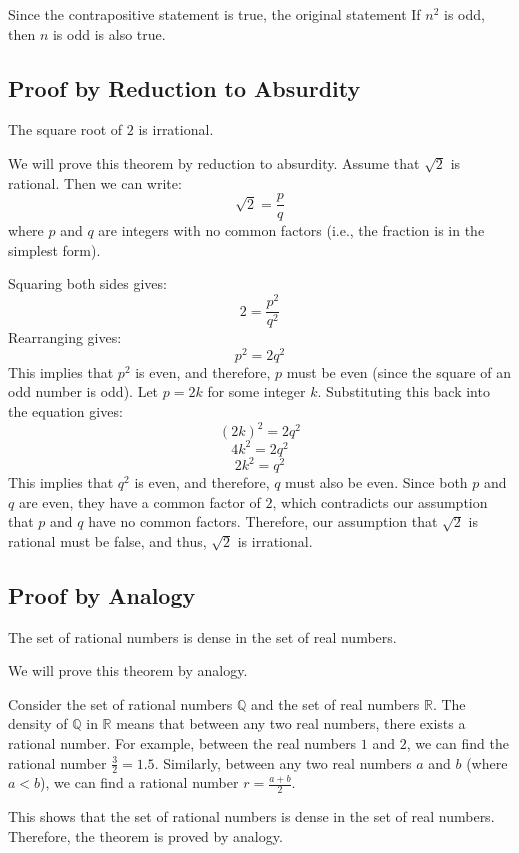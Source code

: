 	Since the contrapositive statement is true, the original statement If \( n^2 \) is odd, then \( n \) is odd is also true.
\QED

\subsection{Proof by Reduction to Absurdity}

The square root of \( 2 \) is irrational.
\vspace{\baselineskip}

	We will prove this theorem by reduction to absurdity. Assume that \( \sqrt{2} \) is rational. Then we can write:
	\[
		\sqrt{2} = \frac{p}{q}
	\]
	where \( p \) and \( q \) are integers with no common factors (i.e., the fraction is in the simplest form).
\vspace{\baselineskip}

	Squaring both sides gives:
	\[
		2 = \frac{p^2}{q^2}
	\]
	Rearranging gives:
	\[
		p^2 = 2q^2
	\]
	This implies that \( p^2 \) is even, and therefore, \( p \) must be even (since the square of an odd number is odd).
	Let \( p = 2k \) for some integer \( k \). Substituting this back into the equation gives:
	\[
		{(2k)}^2 = 2q^2
	\]
	\[
		4k^2 = 2q^2
	\]
	\[
		2k^2 = q^2
	\]
	This implies that \( q^2 \) is even, and therefore, \( q \) must also be even.
	Since both \( p \) and \( q \) are even, they have a common factor of \( 2 \), which contradicts our assumption that \( p \) and \( q \) have no common factors.
	Therefore, our assumption that \( \sqrt{2} \) is rational must be false, and thus, \( \sqrt{2} \) is irrational.

\QED

\subsection{Proof by Analogy}

The set of rational numbers is dense in the set of real numbers.

We will prove this theorem by analogy.
\vspace{\baselineskip}
	
Consider the set of rational numbers \( \mathbb{Q} \) and the set of real numbers \( \mathbb{R} \). The density of \( \mathbb{Q} \) in \( \mathbb{R} \) means that between any two real numbers, there exists a rational number.
For example, between the real numbers \( 1 \) and \( 2 \), we can find the rational number \( \frac{3}{2} = 1.5 \). Similarly, between any two real numbers \( a \) and \( b \) (where \( a < b \)), we can find a rational number \( r = \frac{a + b}{2} \).
\vspace{\baselineskip}

This shows that the set of rational numbers is dense in the set of real numbers.
Therefore, the theorem is proved by analogy.

\QED


